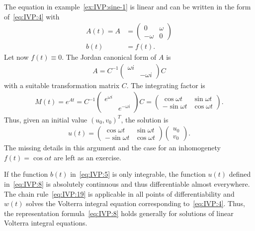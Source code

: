 \begin{example}
  \label{ex:IVP:sine-2}
  The equation in example~\ref{ex:IVP:sine-1} is linear and can be
  written in the form of~\eqref{eq:IVP:4} with
  \begin{align*}
    A(t) = A &=
    \begin{pmatrix}
      0 & \omega \\ -\omega & 0
    \end{pmatrix}
    \\
    b(t) &= f(t).
  \end{align*}
  Let now $f(t) \equiv 0$. The Jordan canonical form of $A$ is
  \begin{gather*}
    A = C^{-1}
    \begin{pmatrix}
      \omega i \\ & -\omega i
    \end{pmatrix}
    C
  \end{gather*}
  with a suitable transformation matrix $C$. The integrating factor is
  \begin{gather*}
    M(t) = e^{At} = C^{-1}
    \begin{pmatrix}
      e^{\omega i} \\ & e^{-\omega i}
    \end{pmatrix} C
    =
    \begin{pmatrix}
      \cos \omega t & \sin \omega t \\
      -\sin \omega t & \cos \omega t
    \end{pmatrix}.
  \end{gather*}
  Thus, given an initial value $(u_0, v_0)^T$, the solution is
  \begin{gather*}
    u(t) =  \begin{pmatrix}
      \cos \omega t & \sin \omega t \\
      -\sin \omega t & \cos \omega t
    \end{pmatrix}
    \begin{pmatrix}
      u_0\\v_0
    \end{pmatrix}.
  \end{gather*}
  The missing details in this argument and the case for an
  inhomogenety $f(t) = \cos \alpha t$ are left as an exercise.
\end{example}

\begin{remark}
  If the function $b(t)$ in~\eqref{eq:IVP:5} is only integrable, the
  function $u(t)$ defined in~\eqref{eq:IVP:8} is absolutely continuous
  and thus differentiable almost everywhere. The chain
  rule~\eqref{eq:IVP:19} is applicable in all points of
  differentiability and $w(t)$ solves the Volterra integral equation
  corresponding to~\eqref{eq:IVP:4}. Thus, the representation
  formula~\eqref{eq:IVP:8} holds generally for solutions of linear
  Volterra integral equations.
\end{remark}

